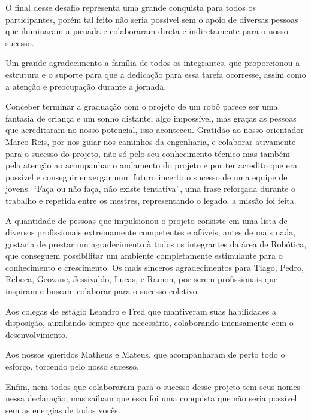 \begin{agradecimentos}
O final desse desafio representa uma grande conquista para todos os participantes, porém tal feito não seria possível sem o apoio de diversas pessoas que iluminaram a jornada e colaboraram direta e indiretamente para o nosso sucesso.

Um grande agradecimento a família de todos os integrantes, que proporcionou a estrutura e o suporte para que a dedicação para essa tarefa ocorresse, assim como a atenção e preocupação durante a jornada.

Conceber terminar a graduação com o projeto de um robô parece ser uma fantasia de criança e um sonho distante, algo impossível, mas graças as pessoas que acreditaram no nosso potencial, isso aconteceu. Gratidão ao nosso orientador Marco Reis, por nos guiar nos caminhos da engenharia, e colaborar ativamente para o sucesso do projeto, não só pelo seu conhecimento técnico mas também pela atenção ao acompanhar o andamento do projeto e por ter acredito que era possível e conseguir enxergar num futuro incerto o sucesso de uma equipe de jovens.  “Faça ou não faça, não existe tentativa”, uma frase reforçada durante o trabalho e repetida entre os mestres, representando o legado, a missão foi feita.

A quantidade de pessoas que impulsionou o projeto consiste em uma lista de diversos profissionais extremamente competentes e afáveis, antes de mais nada, gostaria de prestar um agradecimento à todos os integrantes da área de Robótica, que conseguem possibilitar um ambiente completamente estimulante para o conhecimento e crescimento. Os mais sinceros agradecimentos para Tiago, Pedro, Rebeca, Geovane, Jessivaldo, Lucas, e Ramon, por serem profissionais que inspiram e buscam colaborar para o sucesso coletivo. 

Aos colegas de estágio Leandro e Fred que mantiveram suas habilidades a disposição, auxiliando sempre que necessário, colaborando imensamente com o desenvolvimento.

Aos nossos queridos Matheus e Mateus, que acompanharam de perto todo o esforço, torcendo pelo nosso sucesso.

Enfim, nem todos que colaboraram para o sucesso desse projeto tem seus nomes nessa declaração, mas saibam que essa foi uma conquista que não seria possível sem as energias de todos vocês.

	
\end{agradecimentos}